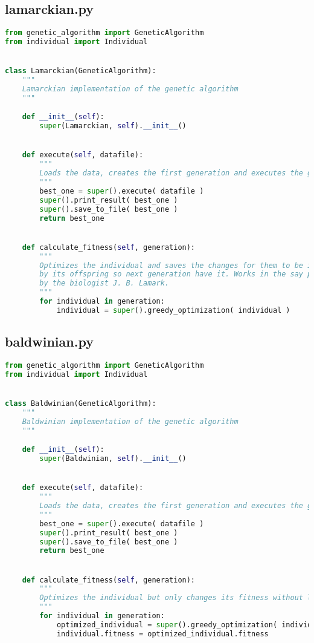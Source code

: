 \newpage

\subsection*{lamarckian.py}
\begin{lstlisting}[language=python]
from genetic_algorithm import GeneticAlgorithm
from individual import Individual


class Lamarckian(GeneticAlgorithm):
    """
    Lamarckian implementation of the genetic algorithm
    """

    def __init__(self):
        super(Lamarckian, self).__init__()


    def execute(self, datafile):
        """
        Loads the data, creates the first generation and executes the genetic algorithm on each generation overloading and executing the child 'calculate_fitness' function. Finally returns the best of 'em all.
        """
        best_one = super().execute( datafile )
        super().print_result( best_one )
        super().save_to_file( best_one )
        return best_one


    def calculate_fitness(self, generation):
        """
        Optimizes the individual and saves the changes for them to be inherited
        by its offspring so next generation have it. Works in the say proposed
        by the biologist J. B. Lamark.
        """
        for individual in generation:
            individual = super().greedy_optimization( individual )
\end{lstlisting}

\newpage

\subsection*{baldwinian.py}
\begin{lstlisting}[language=python]
from genetic_algorithm import GeneticAlgorithm
from individual import Individual


class Baldwinian(GeneticAlgorithm):
    """
    Baldwinian implementation of the genetic algorithm
    """

    def __init__(self):
        super(Baldwinian, self).__init__()


    def execute(self, datafile):
        """
        Loads the data, creates the first generation and executes the genetic algorithm on each generation overloading and executing the child 'calculate_fitness' function. Finally returns the best of 'em all.
        """
        best_one = super().execute( datafile )
        super().print_result( best_one )
        super().save_to_file( best_one )
        return best_one


    def calculate_fitness(self, generation):
        """
        Optimizes the individual but only changes its fitness without letting the optimisation, thus not allowing the optimization to be in it offspring. Works in the way propposed by the psicologist J. M. Baldwin.
        """
        for individual in generation:
            optimized_individual = super().greedy_optimization( individual )
            individual.fitness = optimized_individual.fitness
\end{lstlisting}

